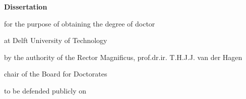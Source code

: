 \begin{titlepage}
	
	
%
%
%
%
%
%

\thispagestyle{empty}

\begin{center}


\vspace*{2\bigskipamount}

{\makeatletter
\titlestyle\bfseries\LARGE\@title
\par
\makeatother}

{\makeatletter
\ifx\@subtitle\undefined\else
    \bigskip
    \titlefont\titleshape\Large\@subtitle
\fi
\makeatother}

\vfill


{\Large\titlefont\bfseries Dissertation}

\bigskip
\bigskip

for the purpose of obtaining the degree of doctor

at Delft University of Technology

by the authority of the Rector Magnificus, prof.dr.ir. T.H.J.J. van der Hagen

chair of the Board for Doctorates

to be defended publicly on



\end{center}
\end{titlepage}
